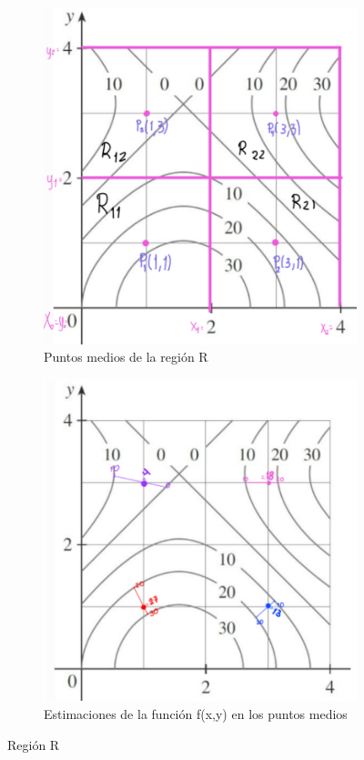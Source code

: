 \documentclass[12pt]{exam}
\begin{document}
\begin{questions}
 
\begin{figure}[H]
    \centering
    \begin{subfigure}[b]{0.4\textwidth}
        \centering
        \includegraphics[width=\textwidth]{./img/i2e2.png}
        \caption{Puntos medios de la región R}
        \label{fig:mapa1}
    \end{subfigure}
    \hfill
    \begin{subfigure}[b]{0.4\textwidth}
        \centering
        \includegraphics[width=\textwidth]{./img/i3e2.png}
        \caption{Estimaciones de la función f(x,y) en los puntos medios}
        \label{fig:mapa2}
    \end{subfigure}
    \caption{Región R }
\end{figure}



\end{questions}
\end{document}
